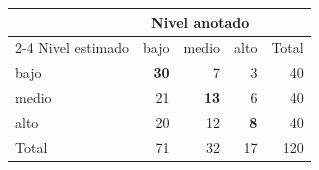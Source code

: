 \begin{tabular}{lrrrr}
\toprule
 & \multicolumn{3}{c}{Nivel anotado} & \\
\cmidrule(lr){2-4}
Nivel estimado & bajo & medio & alto & Total \\
\midrule
bajo  & \textbf{30} & 7  & 3 & 40 \\
medio & 21 & \textbf{13} & 6 & 40 \\
alto  & 20 & 12 & \textbf{8} & 40 \\
\midrule
Total & 71 & 32 & 17 & 120 \\
\bottomrule
\end{tabular}
